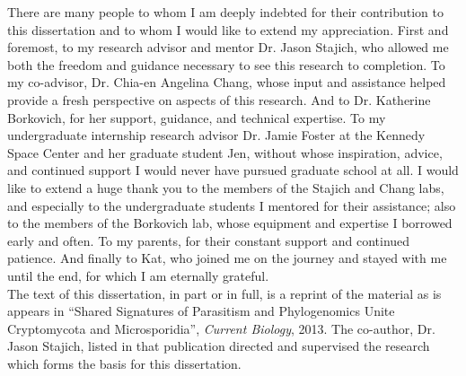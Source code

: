 \documentclass[11pt]{UCR_latex_template/ucr}
\begin{document}
\begin{frontmatter}
\begin{acknowledgements}
There are many people to whom I am deeply indebted for their contribution to this dissertation and to whom I would like to extend my appreciation. First and foremost, to my research advisor and mentor Dr. Jason Stajich, who allowed me both the freedom and guidance necessary to see this research to completion. To my co-advisor, Dr. Chia-en Angelina Chang, whose input and assistance helped provide a fresh perspective on aspects of this research. And to Dr. Katherine Borkovich, for her support, guidance, and technical expertise. To my undergraduate internship research advisor Dr. Jamie Foster at the Kennedy Space Center and her graduate student Jen, without whose inspiration, advice, and continued support I would never have pursued graduate school at all. I would like to extend a huge thank you to the members of the Stajich and Chang labs, and especially to the undergraduate students I mentored for their assistance; also to the members of the Borkovich lab, whose equipment and expertise I borrowed early and often. To my parents, for their constant support and continued patience. And finally to Kat, who joined me on the journey and stayed with me until the end, for which I am eternally grateful.\\
\indent The text of this dissertation, in part or in full, is a reprint of the material as is appears in \enquote{Shared Signatures of Parasitism and Phylogenomics Unite Cryptomycota and Microsporidia}, \emph{Current Biology}, 2013.  The co-author, Dr. Jason Stajich, listed in that publication directed and supervised the research which forms the basis for this dissertation.\\
\end{acknowledgements}




\tableofcontents
\listoffigures
\listoftables
\end{frontmatter}
\end{document}
